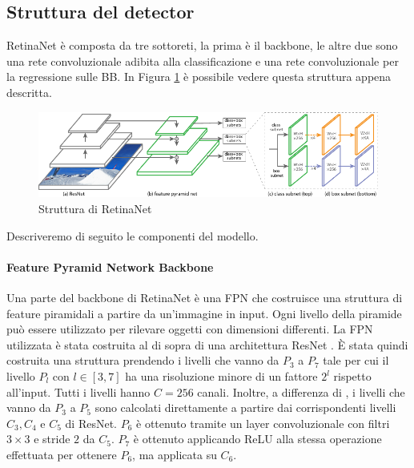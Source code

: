 \subsection{Struttura del detector}
\label{subsec:retinanet_structure}
RetinaNet è composta da tre sottoreti, la prima è il backbone, le altre due sono una rete convoluzionale adibita alla classificazione e una rete convoluzionale per la regressione sulle \ac{BB}. In Figura \ref{fig:retinanet_structure} è possibile vedere questa struttura appena descritta.
\begin{figure}
    \centering
    \includegraphics[width=\textwidth]{images/retinanet_net.pdf}
    \caption{Struttura di RetinaNet}
    \label{fig:retinanet_structure}
\end{figure}
Descriveremo di seguito le componenti del modello.
\paragraph{Feature Pyramid Network Backbone}
Una parte del backbone di RetinaNet è una \ac{FPN} \cite{lin2017feature} che costruisce una struttura di feature piramidali a partire da un'immagine in input. Ogni livello della piramide può essere utilizzato per rilevare oggetti con dimensioni differenti. 
La \ac{FPN} utilizzata è stata costruita al di sopra di una architettura ResNet \cite{he2016deep}. È stata quindi costruita una struttura prendendo i livelli che vanno da $P_3$ a $P_7$ tale per cui il livello $P_l$ con $l \in [3, 7]$ ha una risoluzione minore di un fattore $2^l$ rispetto all'input. Tutti i livelli hanno $C=256$ canali. Inoltre, a differenza di \cite{lin2017feature}, i livelli che vanno da $P_3$ a $P_5$ sono calcolati direttamente a partire dai corrispondenti livelli $C_3, C_4$ e $C_5$ di ResNet. $P_6$ è ottenuto tramite un layer convoluzionale con filtri $3 \times 3$ e stride $2$ da $C_5$. $P_7$ è ottenuto applicando ReLU alla stessa operazione effettuata per ottenere $P_6$, ma applicata su $C_6$.

